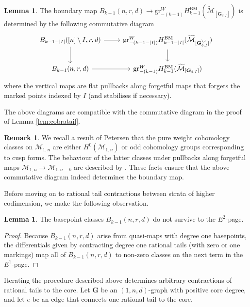\documentclass[12pt,reqno]{amsart}
\theoremstyle{definition}
\theoremstyle{definition}
\theoremstyle{definition}
\theoremstyle{definition}
\newtheorem{lemma}[theorem]{Lemma}
\newtheorem{remark}[theorem]{Remark}
\newcommand{\Mtil}{\widetilde{\mathcal{M}}}
\newcommand{\gr}{\mathrm{gr}}
\begin{document}
\begin{lemma}
The boundary map $B_{k-1}(n, r,d)\to \gr_{-(k-1)}^{W}H_{k-1}^{\mathrm{BM}}(\Mtil_{[\mathbf{G}_{\delta, I}]})$ is determined by the following commutative diagram
\[\begin{tikzcd}
	{B_{k-1-|I|}([n]\setminus I, r,d)} & {\gr_{-(k-1-|I|)}^{W}H_{k-1-|I|}^{\mathrm{BM}}(\Mtil_{[\mathbf{G}_{\delta, I}^{\setminus I}]})} \\
	{B_{k-1}(n, r,d)} & {\gr_{-(k-1)}^{W}H_{k-1}^{\mathrm{BM}}(\Mtil_{[\mathbf{G}_{\delta, I}]})}
	\arrow[from=1-1, to=1-2]
	\arrow[from=1-1, to=2-1]
	\arrow[from=1-2, to=2-2]
	\arrow[from=2-1, to=2-2]
\end{tikzcd}\]
where the vertical maps are flat pullbacks along forgetful maps that forgets the marked points indexed by $I$ (and stabilises if necessary).

The above diagrams are compatible with the commutative diagram in the proof of Lemma \ref{lem:cobratail}.
\end{lemma}

\begin{remark}
  We recall a result of Petersen \cite[Theorems 1.1, 1.3]{pet} that the pure weight cohomology classes on $\mathcal{M}_{1,n}$ are either $H^0(\mathcal{M}_{1,n})$ or odd cohomology groups corresponding to cusp forms. The behaviour of the latter classes under pullbacks along forgetful maps $\mathcal{M}_{1,n}\to \mathcal{M}_{1,n-k}$ are described by \cite[Proposition 2.2]{clp}. These facts ensure that the above commutative diagram indeed determines the boundary map.
\end{remark}

Before moving on to rational tail contractions between strata of higher codimension, we make the following observation.

\begin{lemma}\label{lem:g1baseptE2}
  The basepoint classes $B_{k-1}(n, r,d)$ do not survive to the $E^2$-page.
\end{lemma}
\begin{proof}
  Because $B_{k-1}(n, r,d)$ arise from quasi-maps with degree one basepoints, the differentials given by contracting degree one rational tails (with zero or one markings) map all of $B_{k-1}(n,r,d)$ to non-zero classes on the next term in the $E^1$-page.
\end{proof}

Iterating the procedure described above determines arbitrary contractions of rational tails to the core. Let $\mathbf{G}$ be an $(1,n,d)$-graph with positive core degree, and let $e$ be an edge that connects one rational tail to the core.
\end{document}

